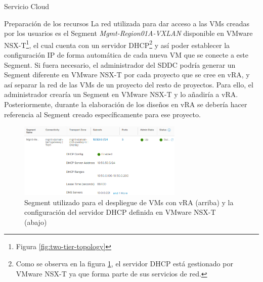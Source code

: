 \begin{subsection}{Servicio Cloud}
\begin{subsubsection}{Preparación de los recursos}
    La red utilizada para dar acceso a las VMs creadas por los usuarios es el Segment \textit{Mgmt-Region01A-VXLAN} disponible en VMware NSX-T\footnote{Figura \ref{fig:two-tier-topology}}, el cual cuenta con un servidor DHCP\footnote{Como se observa en la figura \ref{fig:topology-segment-mgmt}, el servidor DHCP está gestionado por VMware NSX-T ya que forma parte de sus servicios de red.} y así poder establecer la configuración IP de forma automática de cada nueva VM que se conecte a este Segment. Si fuera necesario, el administrador del SDDC podría generar un Segment diferente en VMware NSX-T por cada proyecto que se cree en vRA, y así separar la red de las VMs de un proyecto del resto de proyectos. Para ello, el administrador crearía un Segment en VMware NSX-T y lo añadiría a vRA. Posteriormente, durante la elaboración de los diseños en vRA se debería hacer referencia al Segment creado específicamente para ese proyecto.
    \begin{figure}[h]
        \centering
        \includegraphics[width=0.7\textwidth]{imaxes/pruebaconcepto/vrealize/segment-MGMT.png}
        \caption{Segment utilizado para el despliegue de VMs con vRA (arriba) y la configuración del servidor DHCP definida en VMware NSX-T (abajo)}
        \label{fig:topology-segment-mgmt}
    \end{figure}
    \FloatBarrier

\end{subsubsection}
\end{subsection}
